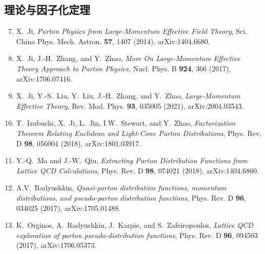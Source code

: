 \documentclass[11pt,a4paper]{ctexart}
\newcommand{\LaMET}{\text{LaMET}}
\begin{document}
\subsection*{\LaMET{} 理论与因子化定理}
\begin{enumerate}\setcounter{enumi}{6}
  \item X.~Ji, \textit{Parton Physics from Large-Momentum Effective Field Theory}, Sci. China Phys. Mech. Astron. \textbf{57}, 1407 (2014), arXiv:1404.6680.
  \item X.~Ji, J.-H.~Zhang, and Y.~Zhao, \textit{More On Large-Momentum Effective Theory Approach to Parton Physics}, Nucl. Phys. B \textbf{924}, 366 (2017), arXiv:1706.07416.
  \item X.~Ji, Y.-S.~Liu, Y.~Liu, J.-H.~Zhang, and Y.~Zhao, \textit{Large-Momentum Effective Theory}, Rev. Mod. Phys. \textbf{93}, 035005 (2021), arXiv:2004.03543.
  \item T.~Izubuchi, X.~Ji, L.~Jin, I.W.~Stewart, and Y.~Zhao, \textit{Factorization Theorem Relating Euclidean and Light-Cone Parton Distributions}, Phys. Rev. D \textbf{98}, 056004 (2018), arXiv:1801.03917.
  \item Y.-Q.~Ma and J.-W.~Qiu, \textit{Extracting Parton Distribution Functions from Lattice QCD Calculations}, Phys. Rev. D \textbf{98}, 074021 (2018), arXiv:1404.6860.
  \item A.V.~Radyushkin, \textit{Quasi-parton distribution functions, momentum distributions, and pseudo-parton distribution functions}, Phys. Rev. D \textbf{96}, 034025 (2017), arXiv:1705.01488.
  \item K.~Orginos, A.~Radyushkin, J.~Karpie, and S.~Zafeiropoulos, \textit{Lattice QCD exploration of parton pseudo-distribution functions}, Phys. Rev. D \textbf{96}, 094503 (2017), arXiv:1706.05373.
\end{enumerate}
\end{document}
